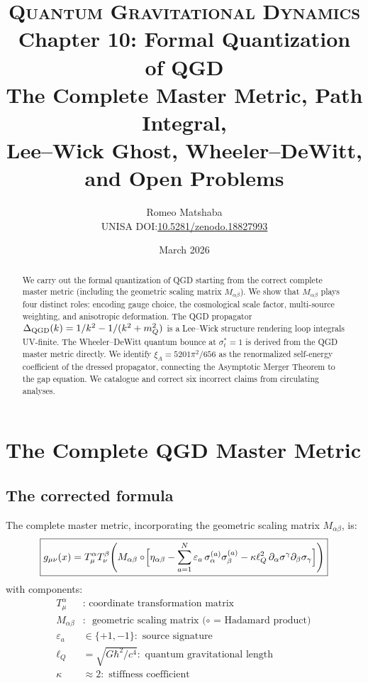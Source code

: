 \documentclass[11pt,a4paper]{article}
\title{%
  \vspace{-1.2cm}
  {\large\scshape Quantum Gravitational Dynamics}\\[6pt]
  {\LARGE\bfseries Chapter 10: Formal Quantization of QGD}\\[6pt]
  {\large The Complete Master Metric, Path Integral,\\
  Lee--Wick Ghost, Wheeler--DeWitt, and Open Problems}
}
\author{Romeo Matshaba\\[3pt]
  \small UNISA\quad
  DOI:\href{https://doi.org/10.5281/zenodo.18827993}{10.5281/zenodo.18827993}}
\date{March 2026}
\theoremstyle{plain}
\theoremstyle{definition}
\theoremstyle{remark}
\newcommand{\lQ}{\ell_Q}
\newcommand{\mQ}{m_Q}
\newcommand{\xiA}{\xi_A}
\newcommand{\sigt}{\sigma_t}
\begin{document}
\maketitle\thispagestyle{empty}

\begin{abstract}
\noindent
We carry out the formal quantization of QGD starting from the correct
complete master metric (including the geometric scaling matrix $M_{\alpha\beta}$).
We show that $M_{\alpha\beta}$ plays four distinct roles: encoding gauge choice,
the cosmological scale factor, multi-source weighting, and anisotropic deformation.
The QGD propagator $\Delta_{\rm QGD}(k)=1/k^2-1/(k^2+\mQ^2)$ is a Lee--Wick
structure rendering loop integrals UV-finite.  The Wheeler--DeWitt quantum bounce
at $\sigt^*=1$ is derived from the QGD master metric directly.  We identify
$\xiA=5201\pi^2/656$ as the renormalized self-energy coefficient of the
dressed propagator, connecting the Asymptotic Merger Theorem to the gap equation.
We catalogue and correct six incorrect claims from circulating analyses.
\end{abstract}

\tableofcontents\newpage

\section{The Complete QGD Master Metric}
\label{sec:metric}

\subsection{The corrected formula}

The complete master metric, incorporating the geometric scaling matrix
$M_{\alpha\beta}$, is:
\begin{equation}
  \boxed{g_{\mu\nu}(x) = T^\alpha_\mu T^\beta_\nu\!\left(
    M_{\alpha\beta}\circ\!\Bigl[
      \eta_{\alpha\beta}
      - \sum_{a=1}^N\varepsilon_a\,\sigma_\alpha^{(a)}\sigma_\beta^{(a)}
      - \kappa\lQ^2\,\partial_\alpha\sigma^\gamma\partial_\beta\sigma_\gamma
    \Bigr]\right)}
  \label{eq:master_metric}
\end{equation}
with components:
\begin{align*}
  T^\alpha_\mu &:\text{ coordinate transformation matrix}\\
  M_{\alpha\beta} &:\text{ geometric scaling matrix ($\circ$ = Hadamard product)}\\
  \varepsilon_a&\in\{+1,-1\}:\text{ source signature}\\
  \lQ &= \sqrt{G\hbar^2/c^4}:\text{ quantum gravitational length}\\
  \kappa &\approx 2:\text{ stiffness coefficient}
\end{align*}
\end{document}
